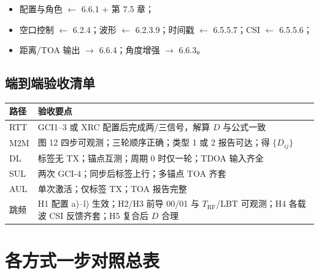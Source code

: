 \documentclass[11pt,a4paper]{ctexart}
\begin{document}
\begin{itemize}[nosep]
  \item 配置与角色 $\leftarrow$ 6.6.1 + 第 7.5 章；
  \item 空口控制 $\leftarrow$ 6.2.4；波形 $\leftarrow$ 6.2.3.9；时间戳 $\leftarrow$ 6.5.5.7；CSI $\leftarrow$ 6.5.5.6；
  \item 距离/TOA 输出 $\rightarrow$ 6.6.4；角度增强 $\rightarrow$ 6.6.3。
\end{itemize}

\subsection{端到端验收清单}

\begin{table}[h]
\centering
\small
\begin{tabular}{L{2.2cm}L{10.5cm}}
\toprule
\textbf{路径} & \textbf{验收要点} \\
\midrule
RTT & GCI1--3 或 XRC 配置后完成两/三信号，解算 $D$ 与公式一致 \\
M2M & 图 12 四步可观测；三轮顺序正确；类型 1 或 2 报告可达；得 $\{D_{ij}\}$ \\
DL & 标签无 TX；锚点互测；周期 0 时仅一轮；TDOA 输入齐全 \\
SUL & 两次 GCI-4；同步后标签上行；多锚点 TOA 齐套 \\
AUL & 单次激活；仅标签 TX；TOA 报告完整 \\
跳频 & H1 配置 a)--l) 生效；H2/H3 前导 00/01 与 $T_{\mathrm{RF}}$/LBT 可观测；H4 各载波 CSI 反馈齐套；H5 复合后 $D$ 合理 \\
\bottomrule
\end{tabular}
\end{table}

\section{各方式一步对照总表}
\end{document}
